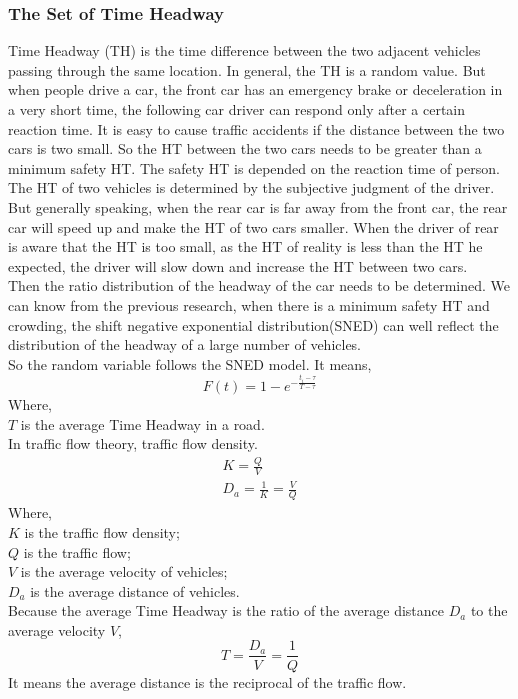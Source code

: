 \documentclass{mcmthesis}
\newcommand{\upcite}[1]{\textsuperscript{\textsuperscript{\cite{#1}}}}
\begin{document}
\subsubsection{The Set of Time Headway}
\indent Time Headway (TH) is the time difference between the two adjacent vehicles passing through the same location. In general, the TH is a random value. But when people drive a car, the front car has an emergency brake or deceleration in a very short time, the following car driver can respond only after a certain reaction time. It is easy to cause traffic accidents if the distance between the two cars is two small. So the HT between the two cars needs to be greater than a minimum safety HT. The safety HT is depended on the reaction time of person.\\
\indent The HT of two vehicles is determined by the subjective judgment of the driver. But generally speaking, when the rear car is far away from the front car, the rear car will speed up and make the HT of two cars smaller. When the driver of rear is aware that the HT is too small, as the HT of reality is less than the HT he expected, the driver will slow down and increase the HT between two cars.\\
\indent Then the ratio distribution of the headway of the car needs to be determined. We can know from the previous research\upcite{TH}, when there is a minimum safety HT and crowding, the shift negative exponential distribution(SNED) can well reflect the distribution of the headway of a large number of vehicles.\\
\indent So the random variable follows the SNED model. It means,
\begin{equation}
		F(t)=1-e^{-\frac{t_{i}-\tau }{T-\tau}}
\end{equation}
\indent Where, \\
\indent $T$ is the average Time Headway in a road.\\ 
\indent In traffic flow theory, traffic flow density.\\
\begin{equation}
\begin{split}
 K = \frac{Q}{V}\\
 D_{a}=\frac{1}{K}=\frac{V}{Q}
\end{split}
\end{equation}
\indent Where, \\
\indent $K$ is the traffic flow density;\\ 
\indent $Q$ is the traffic flow;\\
\indent $V$ is the average velocity of vehicles;\\
\indent $D_{a}$ is the average distance of vehicles.\\
\indent Because the average Time Headway is the ratio of the average distance $D_{a}$ to the average velocity $V $,\\
\begin{equation}
	T=\frac{D_{a}}{V}=\frac{1}{Q}
\end{equation}
\indent It means the average distance is the reciprocal of the traffic flow.
\end{document}
